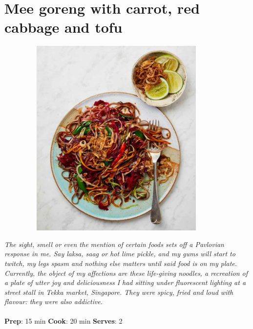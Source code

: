 \documentclass{book}
\begin{document}
\section{Mee goreng with carrot, red cabbage and tofu}
\begin{figure}
\centering\includegraphics[width=10cm,height=10cm,keepaspectratio]{Recipe_Pictures/Mee_goreng_with_carrot,_red_cabbage_and_tofu.png}
\end{figure}
\emph{The sight, smell or even the mention of certain foods sets off a Pavlovian response in me. Say laksa, saag or hot lime pickle, and my gums will start to twitch, my legs spasm and nothing else matters until said food is on my plate. \\ 
Currently, the object of my affections are these life-giving noodles, a recreation of a plate of utter joy and deliciousness I had sitting under fluorescent lighting at a street stall in Tekka market, Singapore. They were spicy, fried and loud with flavour: they were also addictive.}\\\\ 
\textbf{Prep}: 15 min
\textbf{Cook}: 20 min
\textbf{Serves}: 2
\end{document}
